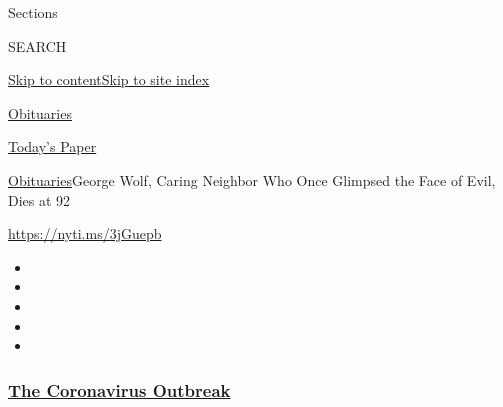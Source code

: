 Sections

SEARCH

\protect\hyperlink{site-content}{Skip to
content}\protect\hyperlink{site-index}{Skip to site index}

\href{https://www.nytimes3xbfgragh.onion/section/obituaries}{Obituaries}

\href{https://myaccount.nytimes3xbfgragh.onion/auth/login?response_type=cookie\&client_id=vi}{}

\href{https://www.nytimes3xbfgragh.onion/section/todayspaper}{Today's
Paper}

\href{/section/obituaries}{Obituaries}\textbar{}George Wolf, Caring
Neighbor Who Once Glimpsed the Face of Evil, Dies at 92

\url{https://nyti.ms/3jGuepb}

\begin{itemize}
\item
\item
\item
\item
\item
\end{itemize}

\hypertarget{the-coronavirus-outbreak}{%
\subsubsection{\texorpdfstring{\href{https://www.nytimes3xbfgragh.onion/news-event/coronavirus?name=promo-coronavirus-obits\&region=TOP_BANNER\&block=storyline_menu_recirc\&action=click\&pgtype=Article\&impression_id=0dd7bcd0-f1d2-11ea-aea1-c3876f91f510\&variant=undefined}{The
Coronavirus
Outbreak}}{The Coronavirus Outbreak}}\label{the-coronavirus-outbreak}}

